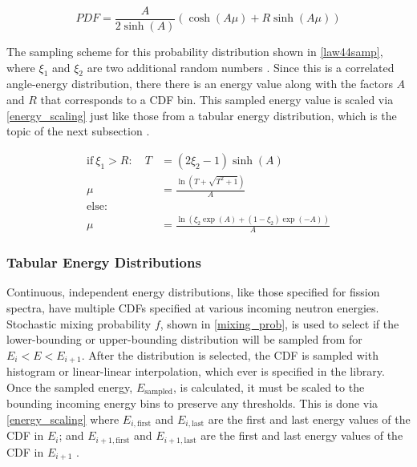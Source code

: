 \begin{equation}
\label{law44}
PDF = \frac{A}{2 \sinh (A)} ( \cosh(A\mu)+R \sinh (A\mu))
\end{equation}

The sampling scheme for this probability distribution shown in \eqref{law44samp}, where $\xi_1$ and $\xi_2$ are two additional random numbers .  Since this is a correlated angle-energy distribution, there there is an energy value along with the factors $A$ and $R$ that corresponds to a CDF bin.  This sampled energy value is scaled via \eqref{energy_scaling} just like those from a tabular energy distribution, which is the topic of the next subsection \cite{3rdsampler}\cite{openmc}.

\begin{equation}
\label{law44samp}
\begin{split}
\mathrm{if} \: \xi_1 > R:  \quad T&=(2\xi_2-1)\sinh(A)\\
\mu &= \frac{\ln(T+\sqrt{T^2+1})}{A}\\
\mathrm{else: }  \qquad & \\
\mu &= \frac{ \ln(\xi_2 \exp(A) + (1-\xi_2)\exp(-A))}{A}
\end{split}
\end{equation}

\subsubsection{Tabular Energy Distributions}

Continuous, independent energy distributions, like those specified for fission spectra, have multiple CDFs specified at various incoming neutron energies.  Stochastic mixing probability $f$, shown in \eqref{mixing_prob}, is used to select if the lower-bounding or upper-bounding distribution will be sampled from for $E_i < E < E_{i+1}$.  After the distribution is selected, the CDF is sampled with histogram or linear-linear interpolation, which ever is specified in the library.  Once the sampled energy, $E_\mathrm{sampled}$, is calculated, it must be scaled to the bounding incoming energy bins to preserve any thresholds.  This is done via \eqref{energy_scaling} where $E_{i,\mathrm{first}}$ and $E_{i,\mathrm{last}}$ are the first and last energy values of the CDF in $E_i$; and $E_{i+1,\mathrm{first}}$ and $E_{i+1,\mathrm{last}}$ are the first and last energy values of the CDF in $E_{i+1}$ \cite{mcnp}.

